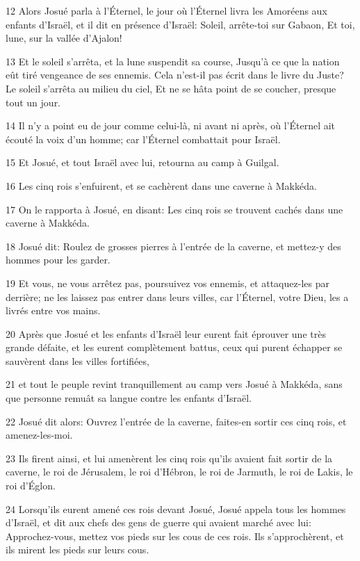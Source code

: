 \par 12 Alors Josué parla à l'Éternel, le jour où l'Éternel livra les Amoréens aux enfants d'Israël, et il dit en présence d'Israël: Soleil, arrête-toi sur Gabaon, Et toi, lune, sur la vallée d'Ajalon!
\par 13 Et le soleil s'arrêta, et la lune suspendit sa course, Jusqu'à ce que la nation eût tiré vengeance de ses ennemis. Cela n'est-il pas écrit dans le livre du Juste? Le soleil s'arrêta au milieu du ciel, Et ne se hâta point de se coucher, presque tout un jour.
\par 14 Il n'y a point eu de jour comme celui-là, ni avant ni après, où l'Éternel ait écouté la voix d'un homme; car l'Éternel combattait pour Israël.
\par 15 Et Josué, et tout Israël avec lui, retourna au camp à Guilgal.
\par 16 Les cinq rois s'enfuirent, et se cachèrent dans une caverne à Makkéda.
\par 17 On le rapporta à Josué, en disant: Les cinq rois se trouvent cachés dans une caverne à Makkéda.
\par 18 Josué dit: Roulez de grosses pierres à l'entrée de la caverne, et mettez-y des hommes pour les garder.
\par 19 Et vous, ne vous arrêtez pas, poursuivez vos ennemis, et attaquez-les par derrière; ne les laissez pas entrer dans leurs villes, car l'Éternel, votre Dieu, les a livrés entre vos mains.
\par 20 Après que Josué et les enfants d'Israël leur eurent fait éprouver une très grande défaite, et les eurent complètement battus, ceux qui purent échapper se sauvèrent dans les villes fortifiées,
\par 21 et tout le peuple revint tranquillement au camp vers Josué à Makkéda, sans que personne remuât sa langue contre les enfants d'Israël.
\par 22 Josué dit alors: Ouvrez l'entrée de la caverne, faites-en sortir ces cinq rois, et amenez-les-moi.
\par 23 Ils firent ainsi, et lui amenèrent les cinq rois qu'ils avaient fait sortir de la caverne, le roi de Jérusalem, le roi d'Hébron, le roi de Jarmuth, le roi de Lakis, le roi d'Églon.
\par 24 Lorsqu'ils eurent amené ces rois devant Josué, Josué appela tous les hommes d'Israël, et dit aux chefs des gens de guerre qui avaient marché avec lui: Approchez-vous, mettez vos pieds sur les cous de ces rois. Ils s'approchèrent, et ils mirent les pieds sur leurs cous.
